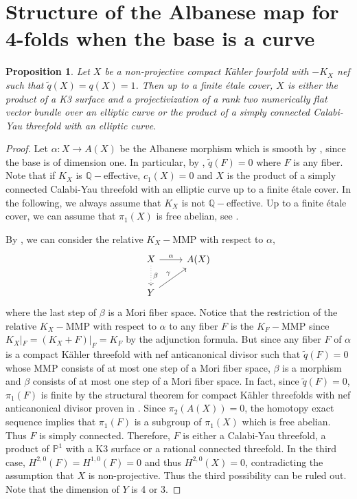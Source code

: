\documentclass[a4, 12pt]{amsart}
\newtheorem{prop}[thm]{Proposition}
\numberwithin{equation}{section}
\theoremstyle{definition}
\def\Q{\mathbb{Q}}  \def\C{\mathbb{C}}
\def\P{\mathbb{P}}
\def\P{\mathbb{P}}
\begin{document}
\newpage

\section{Structure of the Albanese map for 4-folds when the base is a curve}
\begin{prop} \label{Prop1}
Let $X$ be a non-projective compact K\"ahler fourfold with $-K_X$ nef such that $\tilde{q}(X)=q(X)=1$.
Then up to a finite \'etale cover, $X$ is either the product of a K3 surface and a projectivization of a rank two numerically flat vector bundle over an elliptic curve or the product of a simply connected Calabi-Yau threefold with an elliptic curve.
\end{prop}
\begin{proof}
Let $\alpha: X \to A(X)$ be the Albanese morphism which is smooth by \cite{Cao13}, since the base is of dimension one.
In particular, by \cite[ Proposition 3.12]{DPS94}, $\tilde{q}(F)=0$ where $F$ is any fiber. 
Note that if $K_X$ is $\Q-$effective, $c_1(X)=0$ and $X$ is the product of a simply connected Calabi-Yau threefold with an elliptic curve up to a finite \'etale cover.
In the following, we always assume that $K_X$ is not $\Q-$effective.
Up to a finite \'etale cover, we can assume that $\pi_1(X)$ is free abelian, see \cite{Pau97}.

By \cite[Theorem 1.2]{DHP23}, we can consider the relative $K_X-$MMP with respect to $\alpha$,
$$\begin{tikzcd}
X \arrow[r, "\alpha"] \arrow[d, "\beta", dotted] & A(X) \\
Y \arrow[ru, "\gamma"]                           &     
\end{tikzcd}$$
where the last step of $\beta$ is a Mori fiber space.
Notice that the restriction of the relative $K_X-$MMP with respect to $\alpha$ to any fiber $F$ is the $K_F-$MMP since $K_X|_F=(K_X+F)|_F=K_F$ by the adjunction formula.
But since any fiber $F$ of $\alpha$
is a compact K\"ahler threefold with nef anticanonical divisor such that $\tilde{q}(F)=0$ whose MMP consists of at most one step of a Mori fiber space,
$\beta$ is a morphism and $\beta$ consists of at most one step of a Mori fiber space.
In fact, since $\tilde{q}(F)=0$, $\pi_1(F)$ is finite by the structural theorem for compact K\"ahler threefolds with nef anticanonical divisor proven in \cite{MW23}.
Since $\pi_2(A(X))=0$, the homotopy exact sequence implies that $\pi_1(F)$ is a subgroup of $\pi_1(X)$ which is free abelian.
Thus $F$ is simply connected.
Therefore, $F$ is either a Calabi-Yau threefold, a product of $\P^1$ with a K3 surface or a rational connected threefold.
In the third case, $H^{2,0}(F)=H^{1,0}(F)=0$ and thus $H^{2,0}(X)=0$,
contradicting the assumption that $X$ is non-projective.
Thus the third possibility can be ruled out.
Note that the dimension of $Y$ is 4 or 3.


\end{proof}
\end{document}
